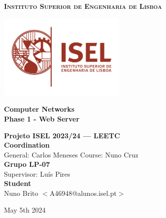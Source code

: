 \documentclass[11pt,a4paper]{report}
\newcommand{\school}{Instituto Superior de Engenharia de Lisboa}
\newcommand{\projisel}{Projeto ISEL 2023/24 --- LEETC}
\newcommand{\projtitle}{Computer Networks}
\newcommand{\projsubtitle}{Phase 1 - Web Server}
\newcommand{\projteam}{Grupo LP-07}
\begin{document}
    \setcounter{page}{1}

\begin{titlepage}
    \center

    \vspace*{-12mm}
    {\large \textbf{\textsc{\school}}}\\

    \vfill

    \includegraphics[width=62mm]{logoisel}
    
    \vfill
    
    {\huge \textbf{\projtitle}}\\[6mm]
    {\Large \textbf{\projsubtitle}}\\
    
    \vfill
    
    \vfill
    
    {\Large \textbf{\projisel}}\\[12mm]
    
    {\Large \textbf{Coordination}}\\[4mm]
    {\large General: Carlos Meneses\hspace*{18mm}
            Course: Nuno Cruz}\\[6mm]
    
    {\Large \textbf{\projteam}}\\[4mm]
    {\large Supervisor: Luís Pires\hspace*{12mm}}\\[6mm]
    
    {\Large \textbf{Student}}\\[4mm]
    {\large Nuno Brito $<$A46948@alunos.isel.pt$>$}
    
    \vspace*{10mm}
    
    \renewcommand{\today}{May 5th 2024}
    \today
    
\end{titlepage}

\tableofcontents
\end{document}
